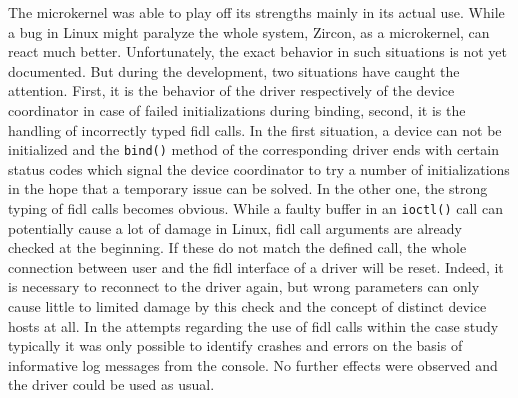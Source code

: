 The microkernel was able to play off its strengths mainly in its actual use.
While a bug in Linux might paralyze the whole system, Zircon, as a microkernel, can react much better.
Unfortunately, the exact behavior in such situations is not yet documented.
But during the development, two situations have caught the attention.
First, it is the behavior of the driver respectively of the device coordinator in case of failed initializations during binding, second, it is the handling of incorrectly typed \ac{fidl} calls.
In the first situation, a device can not be initialized and the \texttt{bind()} method of the corresponding driver ends with certain status codes which signal the device coordinator to try a number of initializations in the hope that a temporary issue can be solved.
In the other one, the strong typing of \ac{fidl} calls becomes obvious.
While a faulty buffer in an \texttt{ioctl()} call can potentially cause a lot of damage in Linux, \ac{fidl} call arguments are already checked at the beginning.
If these do not match the defined call, the whole connection between user and the \ac{fidl} interface of a driver will be reset.
Indeed, it is necessary to reconnect to the driver again, but wrong parameters can only cause little to limited damage by this check and the concept of distinct device hosts at all.
In the attempts regarding the use of \ac{fidl} calls within the case study typically it was only possible to identify crashes and errors on the basis of informative log messages from the console.
No further effects were observed and the driver could be used as usual.

